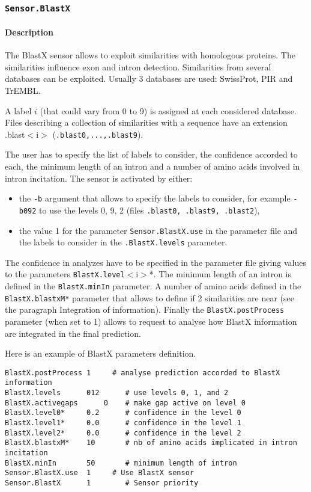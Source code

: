 
\subsubsection{\texttt{Sensor.BlastX}}
\label{blastxlabel}

\paragraph{Description}

The BlastX sensor allows to exploit similarities with homologous
proteins. The similarities influence exon and intron detection.
Similarities from several databases can be exploited. Usually 3
databases are used: SwissProt, PIR and TrEMBL.

A label $i$ (that could vary from 0 to 9) is assigned at each
considered database. Files describing a collection of similarities with
a sequence have an extension .blast$<$i$>$ (\texttt{.blast0,...,.blast9}).

The user has to specify the list of labels to consider, the
confidence accorded to each, the minimum length of an intron and a
number of amino acids involved in intron incitation.  The sensor is
activated by either:
\begin{itemize}
\item the \texttt{-b} argument 
  that allows to specify the labels to consider, for example
  \texttt{-b092} to use the levels 0, 9, 2 (files \texttt{.blast0,
    .blast9, .blast2}),
\item the value 1 for the parameter \texttt{Sensor.BlastX.use} in
  the parameter file and the labels to consider in the
  \texttt{.BlastX.levels} parameter.
\end{itemize}
The confidence in analyzes have to be specified in the parameter file
giving values to the parameters \texttt{BlastX.level}$<$i$>$*.  The
minimum length of an intron is defined in the \texttt{BlastX.minIn}
parameter.  A number of amino acids defined in the
\texttt{BlastX.blastxM*} parameter that allows to define if 2
similarities are near (see the paragraph Integration of information).
Finally the \texttt{BlastX.postProcess} parameter (when set to 1)
allows to request to analyse how BlastX information are integrated in
the final prediction.

Here is an example of BlastX parameters definition.
\begin{Verbatim}[fontsize=\small]
BlastX.postProcess 1     # analyse prediction accorded to BlastX information
BlastX.levels      012      # use levels 0, 1, and 2
BlastX.activegaps      0    # make gap active on level 0
BlastX.level0*     0.2      # confidence in the level 0
BlastX.level1*     0.0      # confidence in the level 1
BlastX.level2*     0.0      # confidence in the level 2
BlastX.blastxM*    10       # nb of amino acids implicated in intron incitation
BlastX.minIn       50       # minimum length of intron
Sensor.BlastX.use  1     # Use BlastX sensor
Sensor.BlastX      1        # Sensor priority
\end{Verbatim}

